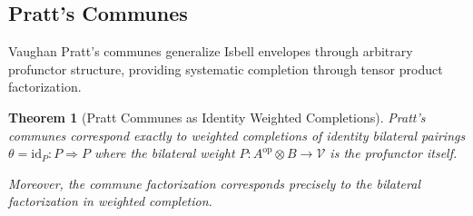 \documentclass[11pt]{article}
\theoremstyle{plain}
\newtheorem{theorem}{Theorem}[section]
\theoremstyle{definition}
\theoremstyle{remark}
\newcommand{\V}{\mathcal{V}}
\newcommand{\op}{\mathrm{op}}
\begin{document}
\subsection{Pratt's Communes}

Vaughan Pratt's communes \cite{pratt2010communes} generalize Isbell envelopes through arbitrary profunctor structure, providing systematic completion through tensor product factorization.

\begin{theorem}[Pratt Communes as Identity Weighted Completions]\label{thm:pratt-correspondence}
Pratt's communes correspond exactly to weighted completions of identity bilateral pairings $\theta = \text{id}_P : P \Rightarrow P$ where the bilateral weight $P : A^{\op} \otimes B \to \V$ is the profunctor itself.

Moreover, the commune factorization corresponds precisely to the bilateral factorization in weighted completion.
\end{theorem}
\end{document}
